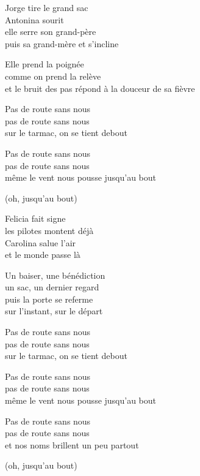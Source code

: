 \begin{lyrics}
Jorge tire le grand sac\\
Antonina sourit\\
elle serre son grand-père\\
puis sa grand-mère et s’incline

Elle prend la poignée\\
comme on prend la relève\\
et le bruit des pas répond
à la douceur de sa fièvre

Pas de route sans nous\\
pas de route sans nous\\
sur le tarmac, on se tient debout

Pas de route sans nous\\
pas de route sans nous\\
même le vent nous pousse jusqu’au bout

(oh, jusqu’au bout)

Felicia fait signe\\
les pilotes montent déjà\\
Carolina salue l’air\\
et le monde passe là

Un baiser, une bénédiction\\
un sac, un dernier regard\\
puis la porte se referme\\
sur l’instant, sur le départ

Pas de route sans nous\\
pas de route sans nous\\
sur le tarmac, on se tient debout

Pas de route sans nous\\
pas de route sans nous\\
même le vent nous pousse jusqu’au bout

Pas de route sans nous\\
pas de route sans nous\\
et nos noms brillent un peu partout

(oh, jusqu’au bout)
\end{lyrics}

